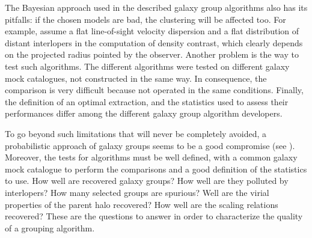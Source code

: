 
The Bayesian approach used in the described galaxy group algorithms also has
its pitfalls: if the chosen models are bad, the clustering will be affected
too. For example, \citet{Yang+07} assume a flat line-of-sight velocity
dispersion and a flat distribution of distant interlopers in the computation of
density contrast, which clearly depends on the projected radius pointed by the
observer. Another problem is the way to test such algorithms. The different
algorithms were tested on different galaxy mock catalogues, not constructed in
the same way. In consequence, the comparison is very difficult because not
operated in the same conditions. Finally, the definition of an optimal
extraction, and the statistics used to assess their performances differ among
the different galaxy group algorithm developers.

To go beyond such limitations that will never be completely avoided,
a probabilistic approach of galaxy groups seems to be a good compromise (see
). Moreover, the tests for algorithms must be well
defined, with a common galaxy mock catalogue to perform the comparisons and a
good definition of the statistics to use. How well are recovered galaxy groups?
How well are they polluted by interlopers? How many selected groups are
spurious? Well are the virial properties of the parent halo recovered? How well
are the scaling
relations recovered? These are the questions to answer in order to
characterize the quality of a grouping algorithm.

